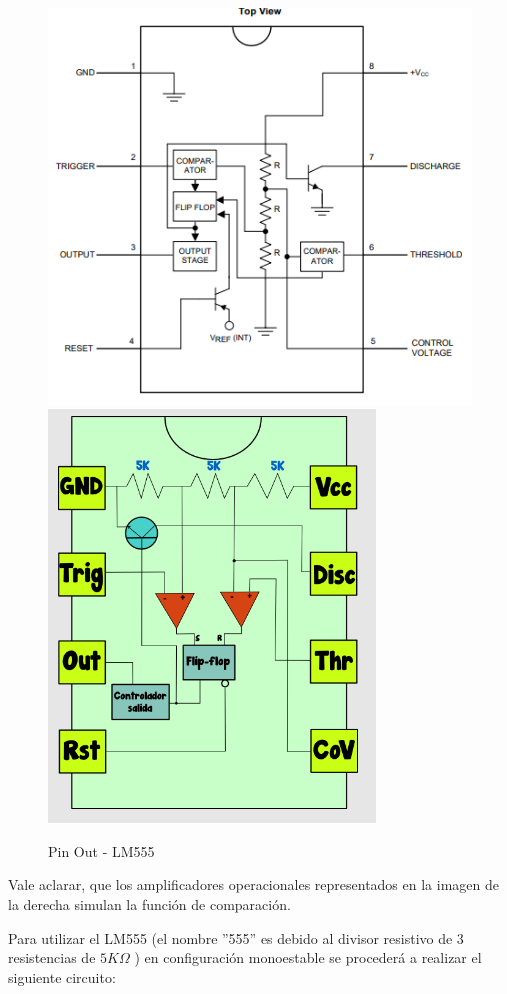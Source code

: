 \begin{figure}[H]
\centering
\includegraphics[scale=0.5]{pinOutLM55(a).PNG}
\qquad
\includegraphics[scale=0.5]{pinOutLM55(b).PNG}
\caption{Pin Out - LM555}
\end{figure}

Vale aclarar, que los amplificadores operacionales representados en
la imagen de la derecha simulan la función de comparación.

Para utilizar el LM555 (el nombre ''555'' es debido al divisor resistivo
de 3 resistencias de $5K\Omega$ ) en configuración monoestable se
procederá a realizar el siguiente circuito:

